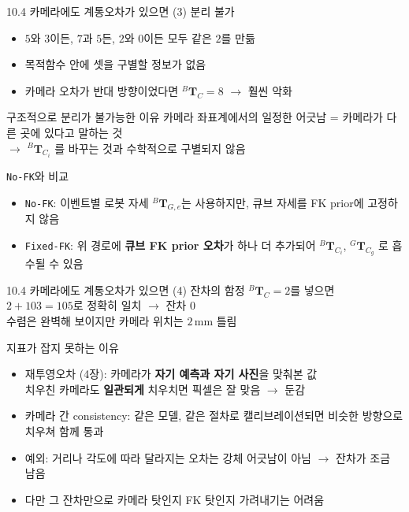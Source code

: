 \documentclass[aspectratio=169,11pt]{beamer}
\newcommand{\T}[3][]{{}^{#2}\mathbf{T}^{#1}_{#3}}   %
\begin{document}
\begin{frame}{10.4 카메라에도 계통오차가 있으면 (3) 분리 불가}
  \begin{itemize}
    \item $5$와 $3$이든, $7$과 $5$든, $2$와 $0$이든 모두 같은 $2$를 만듦
    \item 목적함수 안에 셋을 구별할 정보가 없음
    \item 카메라 오차가 반대 방향이었다면 $\T{B}{C}=8$ $\rightarrow$ 훨씬 악화
  \end{itemize}
  \vfill
  \begin{block}{구조적으로 분리가 불가능한 이유}
    카메라 좌표계에서의 일정한 어긋남 = 카메라가 다른 곳에 있다고 말하는 것\\
    $\rightarrow$ $\T{B}{C_i}$ 를 바꾸는 것과 수학적으로 구별되지 않음
  \end{block}
  \vfill
  \begin{block}{\texttt{No-FK}와 비교}
    \begin{itemize}
      \item \texttt{No-FK}: 이벤트별 로봇 자세 $\T{B}{G,e}$는 사용하지만,
        큐브 자세를 FK prior에 고정하지 않음
      \item \texttt{Fixed-FK}: 위 경로에 \textbf{큐브 FK prior 오차}가 하나 더 추가되어
        $\T{B}{C_i}$, $\T{G}{C_g}$ 로 흡수될 수 있음
    \end{itemize}
  \end{block}
\end{frame}

\begin{frame}{10.4 카메라에도 계통오차가 있으면 (4) 잔차의 함정}
  $\T{B}{C}=2$를 넣으면 $2+103=105$로 정확히 일치
  $\rightarrow$ \alert{잔차 $0$}\\
  수렴은 완벽해 보이지만 카메라 위치는 $2\,\mathrm{mm}$ 틀림
  \vfill
  \begin{block}{지표가 잡지 못하는 이유}
    \begin{itemize}
      \item 재투영오차 (4장): 카메라가 \textbf{자기 예측과 자기 사진}을 맞춰본 값\\
        치우친 카메라도 \textbf{일관되게} 치우치면 픽셀은 잘 맞음 $\rightarrow$ 둔감
      \item 카메라 간 consistency: 같은 모델, 같은 절차로 캘리브레이션되면
        비슷한 방향으로 치우쳐 함께 통과
    \end{itemize}
  \end{block}
  \vfill
  \begin{itemize}
    \item 예외: 거리나 각도에 따라 달라지는 오차는 강체 어긋남이 아님
      $\rightarrow$ 잔차가 조금 남음
    \item 다만 그 잔차만으로 카메라 탓인지 FK 탓인지 가려내기는 어려움
  \end{itemize}
\end{frame}
\end{document}
